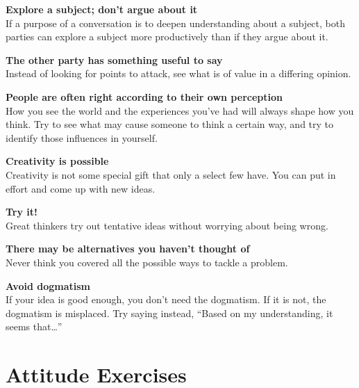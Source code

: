 \textbf{Explore a subject; don't argue about it} \\
If a purpose of a conversation is to deepen understanding about a subject, both parties can explore a subject more productively than if they argue about it.

\textbf{The other party has something useful to say} \\
Instead of looking for points to attack, see what is of value in a differing opinion.

\textbf{People are often right according to their own perception} \\
How you see the world and the experiences you've had will always shape how you think. Try to see what may cause someone to think a certain way, and try to identify those influences in yourself.

\textbf{Creativity is possible} \\
Creativity is not some special gift that only a select few have. You can put in effort and come up with new ideas.

\textbf{Try it!} \\
Great thinkers try out tentative ideas without worrying about being wrong.

\textbf{There may be alternatives you haven't thought of} \\
Never think you covered all the possible ways to tackle a problem.

\textbf{Avoid dogmatism} \\
If your idea is good enough, you don't need the dogmatism. If it is not, the dogmatism is misplaced. Try saying instead, ``Based on my understanding, it seems that\ldots''

\newpage

\section*{Attitude Exercises}

